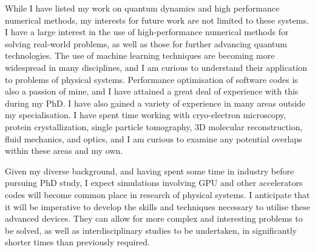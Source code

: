 \documentclass[12pt,a4paper,unicode]{moderncv}
\begin{document}
{    While I have listed my work on quantum dynamics and high performance numerical methods, my interests for future work are not limited to these systems. I have a large interest in the use of high-performance numerical methods for solving real-world problems, as well as those for further advancing quantum technologies. The use of machine learning techniques are becoming more widespread in many disciplines, and I am curious to understand their application to problems of physical systems. Performance optimisation of software codes is also a passion of mine, and I have attained a great deal of experience with this during my PhD. I have also gained a variety of experience in many areas outside my specialisation. I have spent time working with cryo-electron microscopy, protein crystallization, single particle tomography, 3D molecular reconstruction, fluid mechanics, and optics, and I am curious to examine any potential overlaps within these areas and my own.

    Given my diverse background, and having spent some time in industry before pursuing PhD study, I expect simulations involving GPU and other accelerators codes will become common place in research of physical systems. I anticipate that it will be imperative to develop the skills and techniques necessary to utilise these advanced devices. They can allow for more complex and interesting problems to be solved, as well as interdisciplinary studies to be undertaken, in significantly shorter times than previously required.



}
\end{document}
